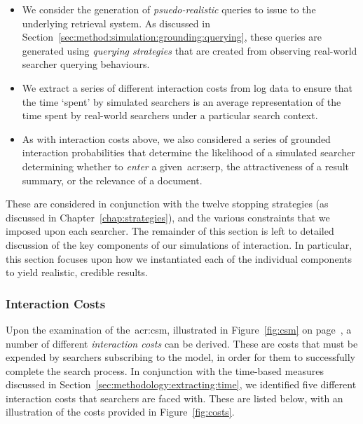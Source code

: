\begin{itemize}
    \item{ We consider the generation of \emph{psuedo-realistic} queries to issue to the underlying retrieval system. As discussed in Section~\ref{sec:method:simulation:grounding:querying}, these queries are generated using \emph{querying strategies} that are created from observing real-world searcher querying behaviours.}
    \item{ We extract a series of different interaction costs from log data to ensure that the time `spent' by simulated searchers is an average representation of the time spent by real-world searchers under a particular search context.}
    \item{ As with interaction costs above, we also considered a series of grounded interaction probabilities that determine the likelihood of a simulated searcher determining whether to \emph{enter} a given~\gls{acr:serp}, the attractiveness of a result summary, or the relevance of a document.}
\end{itemize}

These are considered in conjunction with the twelve stopping strategies (as discussed in Chapter~\ref{chap:strategies}), and the various constraints that we imposed upon each searcher. The remainder of this section is left to detailed discussion of the key components of our simulations of interaction. In particular, this section focuses upon how we instantiated each of the individual components to yield realistic, credible results.

\subsubsection{Interaction Costs}\label{sec:method:simulation:grounding:costs}
Upon the examination of the~\gls{acr:csm}, illustrated in Figure~\ref{fig:csm} on page~\pageref{fig:csm}, a number of different \emph{interaction costs} can be derived. These are costs that must be expended by searchers subscribing to the model, in order for them to successfully complete the search process. In conjunction with the time-based measures discussed in Section~\ref{sec:methodology:extracting:time}, we identified five different interaction costs that searchers are faced with. These are listed below, with an illustration of the costs provided in Figure~\ref{fig:costs}.

